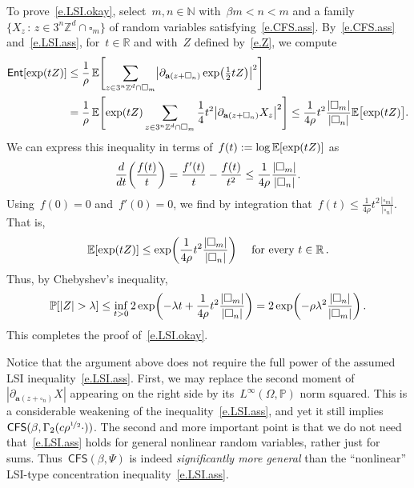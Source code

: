\documentclass[11pt,twoside]{article} %
\let\oldsquare\square %
\renewcommand{\square}{\oldsquare}
\numberwithin{equation}{section}
\theoremstyle{definition}
\let\originalleft\left
\let\originalright\right
\renewcommand{\left}{\mathopen{}\mathclose\bgroup\originalleft}
\renewcommand{\right}{\aftergroup\egroup\originalright}
\newcommand*{\N}{\ensuremath{\mathbb{N}}}
\newcommand*{\R}{\ensuremath{\mathbb{R}}}
\newcommand*{\Zd}{\ensuremath{\mathbb{Z}^d}}
\renewcommand{\a}{\mathbf{a}}
\newcommand{\cu}{\square}
\renewcommand{\P}{\mathbb{P}}
\newcommand{\E}{\mathbb{E}}
\newcommand{\Ent}{\mathsf{Ent}}
\newcommand{\CFS}{\mathsf{CFS}}
\begin{document}
\smallskip

To prove~\eqref{e.LSI.okay}, select~$m,n\in\N$ with~$\beta m<n<m$ and a family~$\{ X_z \,:\, z\in 3^n\Zd\cap \cu_m\}$ of random variables satisfying~\eqref{e.CFS.ass}. By~\eqref{e.CFS.ass} and~\eqref{e.LSI.ass}, for~$t\in\R$ and with~$Z$ defined by~\eqref{e.Z},
we compute
\begin{align*}
\Ent\left[  \exp (tZ)  \right]
& 
\leq 
\frac1\rho\,
\E \Biggl[
\sum_{z\in 3^n\Zd \cap \cu_m}
\bigl| \partial_{\a(z+\cu_n)} \exp\left( \tfrac12tZ \right)
\bigr|^2
\Biggr]
\\ & 
=
\frac1\rho\,
\E \Biggl[  \exp\left( tZ \right) 
\sum_{z\in 3^n\Zd \cap \cu_m}
\frac1{4}t^2 
\bigl| \partial_{\a(z+\cu_n)} X_z \bigr|^2
\Biggr]
\leq 
\frac1{4\rho}t^2 \frac{|\cu_m|}{|\cu_n|}
\E \bigl[  \exp\left( tZ \right) \bigr].
\end{align*}
We can express this inequality in terms of~$f(t):= \log \E \left[  \exp\left( t Z  \right) \right]$ as
\begin{equation*} \label{}
\frac{d}{dt} \left(\frac{f(t)}{t} \right) 
= 
\frac{f'(t)}{t} - \frac{f(t)}{t^2} 
\leq 
\frac1{4\rho} \frac{|\cu_m|}{|\cu_n|}.
\end{equation*}
Using~$f(0) = 0$ and~$f'(0) = 0$, we find by integration that~$f(t) \leq \frac1{4\rho}t^2 \frac{|\cu_m|}{|\cu_n|}$. That is, 
\begin{equation*}
\E \left[  \exp \left( t Z \right) \right]
\leq 
\exp\left( \frac1{4\rho} t^2 \frac{|\cu_m|}{|\cu_n|} \right) 
\quad 
\mbox{ for every~$t \in \R$}\,.
\end{equation*}
Thus, by Chebyshev's inequality, 
\begin{equation}
\P \left[ |Z| > \lambda \right] 
\leq 
\inf_{t>0} 
2 \exp\left( -\lambda t + \frac1{4 \rho} t^2 \frac{|\cu_m|}{|\cu_n|} \right)
=
2\exp \left( - \rho \lambda^2 \frac{|\cu_n|}{|\cu_m|} \right)
\,.
\end{equation}
This completes the proof of~\eqref{e.LSI.okay}. 


\smallskip

Notice that the argument above does not require the full power of the assumed LSI inequality~\eqref{e.LSI.ass}. First, we may replace the second moment of~$|\partial_{\a(z+\cu_n)} X|$ appearing on the right side by its~$L^\infty(\Omega,\P)$ norm squared. This is a considerable weakening of the inequality~\eqref{e.LSI.ass}, and yet it still implies~$\CFS(\beta,\Gamma_2(c\rho^{\nicefrac12}\cdot))$. The second and more important point is that we do not need that~\eqref{e.LSI.ass} holds for general nonlinear random variables, rather just for sums. Thus~$\CFS(\beta,\Psi)$ is indeed \emph{significantly more general} than the ``nonlinear'' LSI-type concentration inequality~\eqref{e.LSI.ass}.
\end{document}
